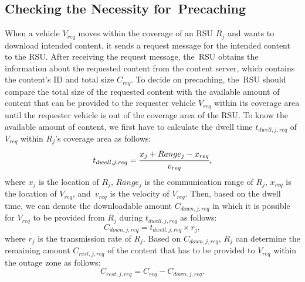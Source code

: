 \documentclass[electronics,aricle,accept,pdftex,moreauthors]{Definitions/mdpi}
\begin{document}
\subsection{Checking the Necessity for~Precaching} \label{sec3.1}
When a vehicle $V_{req}$ moves within the coverage of an RSU $R_{j}$ and wants to download intended content, it sends a request message for the intended content to the RSU. 
After receiving the request message, the~RSU obtains the information about the requested content from the content server, which contains the content's ID and total size $C_{req}$.
To decide on precaching, the~RSU should compare the total size of the requested content with the available amount of content that can be provided to the requester vehicle $V_{req}$ within its coverage area until the requester vehicle is out of the coverage area of the RSU.
To know the available amount of content, we first have to calculate the dwell time $t_{dwell,j,req}$ of $V_{req}$ within $R_{j}$'s coverage area as follows:
\begin{equation}
    t_{dwell,j,req} = \cfrac{x_{j}+Range_{j}-x_{req}}{v_{req}},
\end{equation}
where $x_{j}$ is the location of $R_{j}$, $Range_{j}$ is the communication range of $R_{j}$, $x_{req}$ is the location of $V_{req}$, and~$v_{req}$ is the velocity of $V_{req}$.
Then, based on the dwell time, we can denote the downloadable amount $C_{down,j,req}$ in which it is possible for $V_{req}$ to be provided from $R_{j}$ during $t_{dwell,j,req}$ as follows:
\begin{equation}
    C_{down,j,req} = t_{dwell,j,req}\times r_{j},
\end{equation}
where $r_{j}$ is the transmission rate of $R_{j}$.
Based on $C_{down,j,req}$, $R_{j}$ can determine the remaining amount $C_{rest,j,req}$ of the content that has to be provided to $V_{req}$ within the outage zone as follows:
\begin{equation}
    C_{rest,j,req} = C_{req} - C_{down,j,req}.
\end{equation}
\end{document}
